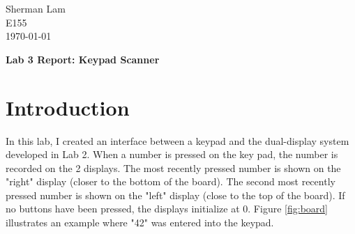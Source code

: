 \documentclass[11pt]{article}
\begin{document}
\begin{flushleft}
Sherman Lam
\\E155
\\ \today
\end{flushleft}


\begin{center}
\begin{Large}
\textbf{Lab 3 Report: Keypad Scanner}
\end{Large}
\end{center}




\section{Introduction}
\label{sec:intro}

In this lab, I created an interface between a keypad and the dual-display system developed in Lab 2. When a number is pressed on the key pad, the number is recorded on the 2 displays. The most recently pressed number is shown on the "right" display (closer to the bottom of the board). The second most recently pressed number is shown on the "left" display (close to the top of the board). If no buttons have been pressed, the displays initialize at 0. Figure \ref{fig:board} illustrates an example where "42" was entered into the keypad.
\end{document}
